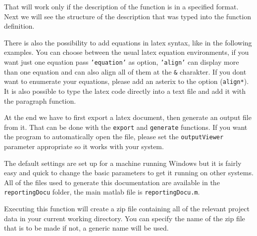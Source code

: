 
That will work only if the description of the function is in a specified format. Next we will see the structure of the description 
that was typed into the function definition.  


There is also the possibility to add equations in latex syntax, like in the following examples. You can choose between the 
usual latex equation environments, if you want just one equation pass {\tt 'equation'} as option, {\tt 'align'} can display
more than one equation and can also align all of them at the {\tt \&} charakter. If you dont want to enumerate your equations, please
add an asterix to the option ({\tt align*}). It is also possible to type the latex code directly into a text file and 
add it with the paragraph function.


At the end we have to first export a latex document, then generate an output file from it. That can be done with the {\tt export} and
{\tt generate} functions. If you want the program to automatically open the file, please set the {\tt outputViewer} parameter
appropriate so it works with your system.


The default settings are set up for a machine running Windows but it is fairly easy and quick to change the basic parameters to get it 
running on other systems. All of the files used to generate this documentation are available in the {\tt reportingDocu} folder, the main
matlab file is {\tt reportingDocu.m}.


Executing this function will create a zip file containing all of the relevant project data in your current working directory. You can 
specify the name of the zip file that is to be made if not, a generic name will be used.






